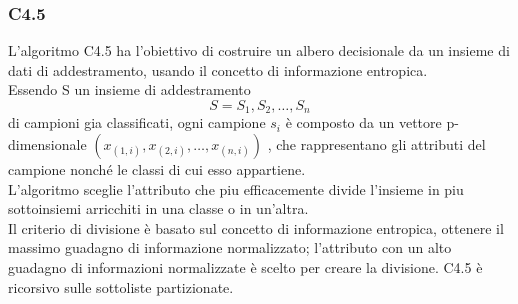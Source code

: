 \documentclass[../tesi.tex]{subfiles}
\begin{document}
\subsubsection{C4.5}
L’algoritmo C4.5 ha l’obiettivo di costruire un  albero decisionale da un insieme di dati di addestramento, usando il concetto di \Gls{informazione entropica}.\\
Essendo S un insieme di addestramento $$ S = S_1 ,S_2,…,S_n$$  di campioni gia classificati, ogni campione $s_i$ è composto da un vettore p-dimensionale $(x_{(1,i)}  ,x_{(2,i)}, … , x_{(n,i)} )$ , che rappresentano gli attributi del campione nonché le classi di cui esso appartiene.\\
L’algoritmo sceglie l’attributo che piu efficacemente divide l’insieme in piu sottoinsiemi arricchiti in una classe o in un’altra.\\
Il criterio di divisione è basato sul concetto di informazione entropica, ottenere il massimo guadagno di informazione normalizzato; l’attributo con un alto guadagno di informazioni normalizzate è scelto per creare la divisione. C4.5 è ricorsivo sulle sottoliste partizionate.
\cite{le2018evaluating}\\
\end{document}

